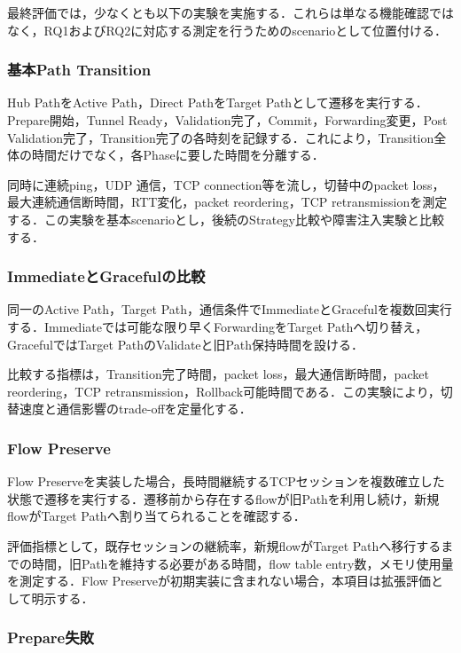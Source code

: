 \documentclass[11pt,a4paper,twoside]{ltjsarticle}
\begin{document}
最終評価では，少なくとも以下の実験を実施する．これらは単なる機能確認ではなく，RQ1およびRQ2に対応する測定を行うためのscenarioとして位置付ける．

\subsubsection{基本Path Transition}

Hub PathをActive Path，Direct PathをTarget Pathとして遷移を実行する．Prepare開始，Tunnel Ready，Validation完了，Commit，Forwarding変更，Post Validation完了，Transition完了の各時刻を記録する．これにより，Transition全体の時間だけでなく，各Phaseに要した時間を分離する．

同時に連続ping，UDP 通信，TCP connection等を流し，切替中のpacket loss，最大連続通信断時間，RTT変化，packet reordering，TCP retransmissionを測定する．この実験を基本scenarioとし，後続のStrategy比較や障害注入実験と比較する．

\subsubsection{ImmediateとGracefulの比較}

同一のActive Path，Target Path，通信条件でImmediateとGracefulを複数回実行する．Immediateでは可能な限り早くForwardingをTarget Pathへ切り替え，GracefulではTarget PathのValidateと旧Path保持時間を設ける．

比較する指標は，Transition完了時間，packet loss，最大通信断時間，packet reordering，TCP retransmission，Rollback可能時間である．この実験により，切替速度と通信影響のtrade-offを定量化する．

\subsubsection{Flow Preserve}

Flow Preserveを実装した場合，長時間継続するTCPセッションを複数確立した状態で遷移を実行する．遷移前から存在するflowが旧Pathを利用し続け，新規flowがTarget Pathへ割り当てられることを確認する．

評価指標として，既存セッションの継続率，新規flowがTarget Pathへ移行するまでの時間，旧Pathを維持する必要がある時間，flow table entry数，メモリ使用量を測定する．Flow Preserveが初期実装に含まれない場合，本項目は拡張評価として明示する．

\subsubsection{Prepare失敗}
\end{document}
